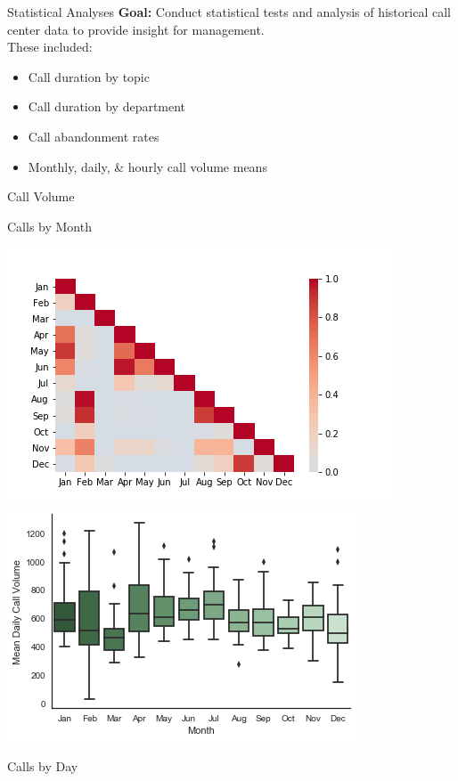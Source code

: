 \documentclass{beamer}
\begin{document}
\begin{frame}{Statistical Analyses}
\textbf{Goal: }Conduct statistical tests and analysis of historical call center data to provide insight for management.\\
These included:
\begin{itemize}
	\item Call duration by topic
	\item Call duration by department
	\item Call abandonment rates
	\item Monthly, daily, \& hourly call volume means
\end{itemize}

\end{frame}

\begin{frame}{Call Volume}
	\begin{center}
		Calls by Month
	\end{center}
    \includegraphics[scale=0.3]{heatmap}
    \includegraphics[scale=0.3]{monthly_boxplot}
    \begin{center}
    	Calls by Day
    \end{center}

\end{frame}
\end{document}
